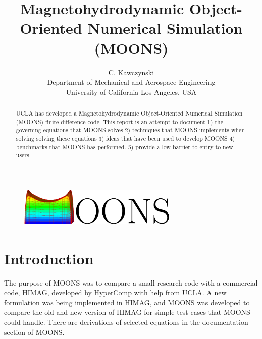 \newcommand{\bibDir}{../../../LATEX/} %

\usepackage{dirtree}
\usepackage{lmodern}
\usepackage{listings}
\usepackage{color}
\usepackage{tikz}

\newcommand{\eqtab}{\;\;\;\;\;\;\;\;\;\;\;\;\;\;\;\;}
\newcommand{\divBz}{$\nabla \bullet B = 0$}
\newcommand{\divB}{$\nabla \bullet B$}
\newcommand{\Rem}{$Re_m$}
\newcommand{\jcrossB}{$j \times B$}

\newcommand{\figW}{5.in}
\newcommand{\figH}{4.in}

\newcommand{\ffigW}{3.1in}
\newcommand{\ffigH}{3.1in}



\doublespacing
\begin{figure}
\centering
\includegraphics[width=3in,height=0.8in]{MOONS_logo.png}
\end{figure}
\title{Magnetohydrodynamic Object-Oriented Numerical Simulation (MOONS)}
\author{C. Kawczynski \\
Department of Mechanical and Aerospace Engineering \\
University of California Los Angeles, USA\\
}
\maketitle

\begin{abstract}
UCLA has developed a Magnetohydrodynamic Object-Oriented Numerical Simulation (MOONS) finite difference code. This report is an attempt to document 1) the governing equations that MOONS solves 2) techniques that MOONS implements when solving solving these equations 3) ideas that have been used to develop MOONS 4) benchmarks that MOONS has performed. 5) provide a low barrier to entry to new users.
\end{abstract}

\section{Introduction}
The purpose of MOONS was to compare a small research code with a commercial code, HIMAG, developed by HyperComp with help from UCLA. A new formulation was being implemented in HIMAG, and MOONS was developed to compare the old and new version of HIMAG for simple test cases that MOONS could handle. There are derivations of selected equations in the documentation section of MOONS.


